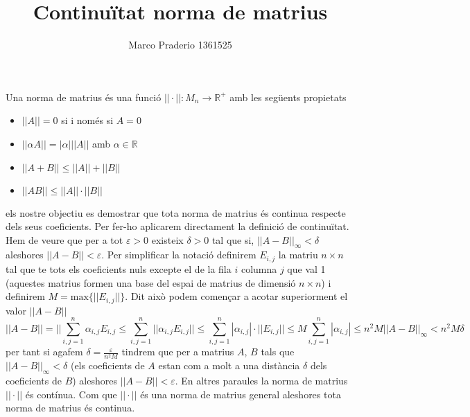 \documentclass[a4paper,10pt]{article}
\title{Continuïtat norma de matrius}
\author{Marco Praderio 1361525}
\date{}
\renewcommand{\*}{\cdot}
\begin{document}
\maketitle
Una norma de matrius és una funció $||\*||:M_n\to \mathbb{R}^+$ amb les següents propietats
\begin{itemize}
 \item $||A||=0$ si i només si $A=0$
 \item $||\alpha A||=|\alpha|||A||$ amb $\alpha\in\mathbb{R}$
 \item $||A+B||\le||A||+||B||$
 \item $||AB||\le||A||\*||B||$
\end{itemize}
els nostre objectiu es demostrar que tota norma de matrius és continua respecte dels seus coeficients. Per fer-ho aplicarem directament la definició de continuïtat.\\
Hem de veure que per a tot $\varepsilon>0$ existeix $\delta>0$ tal que si, $||A-B||_{\infty}<\delta$ aleshores $||A-B||<\varepsilon$. Per simplificar la notació definirem
$E_{i,j}$ la matriu $n\times n$ tal que te tots els coeficients nuls excepte el de la fila $i$ columna $j$ que val 1 (aquestes matrius formen una base del espai de matrius
de dimensió $n\times n$) i definirem $M=\text{max}\{||E_{i,j}||\}$.
Dit això podem començar a acotar superiorment el valor $||A-B||$
$$||A-B||=||\sum_{i,j=1}^n\alpha_{i,j}E_{i,j}\le\sum_{i,j=1}^n||\alpha_{i,j}E_{i,j}||\le\sum_{i,j=1}^n|\alpha_{i,j}|\*||E_{i,j}||\le
M\sum_{i,j=1}^n|\alpha_{i,j}|\le n^2M||A-B||_{\infty}<n^2M\delta$$
per tant si agafem $\delta=\frac{\varepsilon}{n^2M}$ tindrem que per a matrius $A$, $B$ tals que $||A-B||_{\infty}<\delta$ (els coeficients de $A$ estan com a molt a una
distància $\delta$ dels coeficients de $B$) aleshores $||A-B||<\varepsilon$. En altres paraules la norma de matrius $||\*||$ és contínua. Com que $||\*||$ és una norma
de matrius general aleshores tota norma de matrius és continua.
\end{document}
